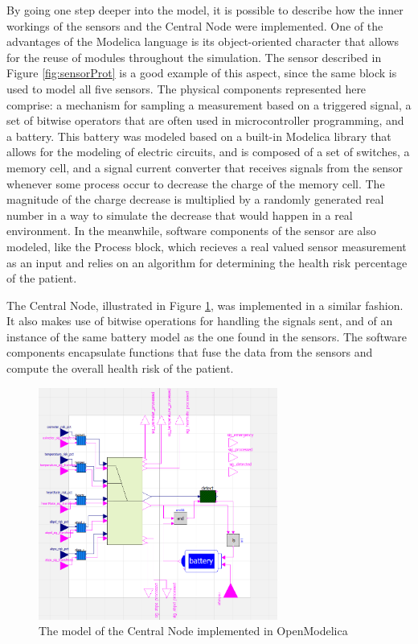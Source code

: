 By going one step deeper into the model, it is possible to describe how the inner workings of the sensors and the Central Node were implemented. One of the advantages of the Modelica language is its object-oriented character that allows for the reuse of modules throughout the simulation. The sensor described in Figure \ref{fig:sensorProt} is a good example of this aspect, since the same block is used to model all five sensors. The physical components represented here comprise: a mechanism for sampling a measurement based on a triggered signal, a set of bitwise operators that are often used in microcontroller programming, and a battery. This battery was modeled based on a built-in Modelica library that allows for the modeling of electric circuits, and is composed of a set of switches, a memory cell, and a signal current converter that receives signals from the sensor whenever some process occur to decrease the charge of the memory cell. The magnitude of the charge decrease is multiplied by a randomly generated real number in a way to simulate the decrease that would happen in a real environment. In the meanwhile, software components of the sensor are also modeled, like the Process block, which recieves a real valued sensor measurement as an input and relies on an algorithm for determining the health risk percentage of the patient.


The Central Node, illustrated in Figure \ref{fig:centralNodeProt}, was implemented in a similar fashion. It also makes use of bitwise operations for handling the signals sent, and of an instance of the same battery model as the one found in the sensors. The software components encapsulate functions that fuse the data from the sensors and compute the overall health risk of the patient.

\begin{figure}[!h]
	\centering
	\includegraphics[width=0.7\textwidth, keepaspectratio]{img/central_node_modelica.png}
	\caption{The model of the Central Node implemented in OpenModelica}
	\label{fig:centralNodeProt}
\end{figure}

